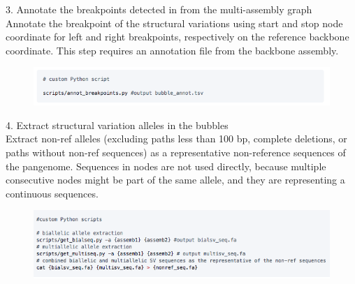\documentclass[../main.tex]{subfiles}
\begin{document}
\begin{flushleft}
\newpage

3. Annotate the breakpoints detected in from the multi-assembly graph \\ Annotate the breakpoint of the structural variations using start and stop node coordinate for left and right breakpoints, respectively on the reference backbone coordinate. This step requires an annotation file from the backbone assembly. \\
\begin{figure}[!htb]
    \centering
    \includegraphics[width=\textwidth]{paper3/supplement/sp431.png}
\end{figure}

4. Extract structural variation alleles in the bubbles \\ Extract non-ref alleles (excluding paths less than 100 bp, complete deletions, or paths without non-ref sequences) as a representative non-reference sequences of the pangenome. Sequences in nodes are not used directly, because multiple consecutive nodes might be part of the same allele, and they are representing a continuous sequences. \\
\begin{figure}[!htb]
    \centering
    \includegraphics[width=\textwidth]{paper3/supplement/sp432.png}
\end{figure}


\renewcommand{\bibname}{Supplementary References}






\end{flushleft}

\ifdefined\BuildingFromMainFile
\else
   
\end{document}

